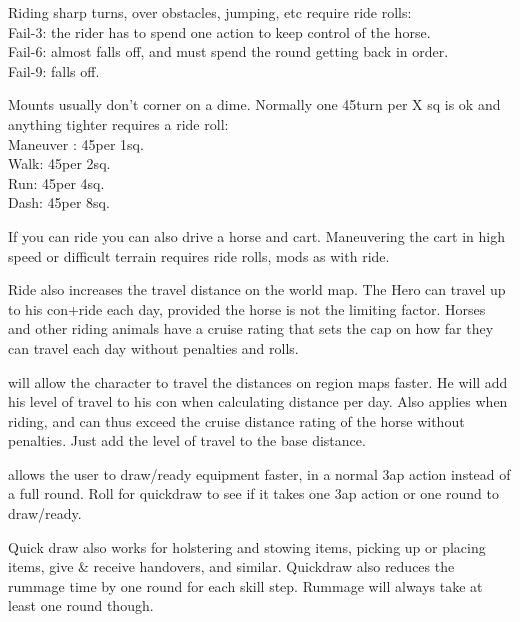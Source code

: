Riding sharp turns, over obstacles, jumping, etc require ride rolls:\\
Fail-3: the rider has to spend one action to keep control of the horse.\\
Fail-6: almost falls off, and must spend the round getting back in order.\\
Fail-9: falls off.

Mounts usually don't corner on a dime. Normally one 45\degrees turn per X sq is ok and anything tighter requires a ride roll:\\
Maneuver : 45\degrees per 1sq.\\
Walk: 45\degrees per 2sq.\\
Run: 45\degrees per 4sq.\\
Dash: 45\degrees per 8sq.


If you can ride you can also drive a horse and cart. Maneuvering the cart in high speed or difficult terrain requires ride rolls, mods as with ride.

Ride also increases the travel distance on the world map. The Hero can travel up to his con+ride each day, provided the horse is not the limiting factor. Horses and other riding animals have a cruise rating that sets the cap on how far they can travel each day without penalties and rolls.


 will allow the character to travel the distances on region maps faster. He will add his level of travel to his con when calculating distance per day. Also applies when riding, and can thus exceed the cruise distance rating of the horse without penalties. Just add the level of travel to the base distance.


 allows the user to draw/ready equipment faster, in a normal 3ap action instead of a full round. Roll for quickdraw to see if it takes one 3ap action or one round to draw/ready. 

Quick draw also works for holstering and stowing items, picking up or placing items, give \& receive handovers, and similar.
Quickdraw also reduces the rummage time by one round for each skill step. Rummage will always take at least one round though.

